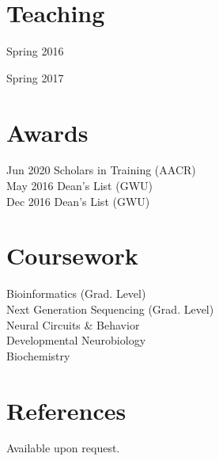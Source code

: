 
\newpage %

\begin{minipage}[t]{0.32\textwidth} %
\sectionspace
\section{Teaching}
\vspace{\topsep} %
\begin{tightitemize}
\item Spring 2016
\item Spring 2017
\end{tightitemize}

\section{Awards} 
Jun 2020 Scholars in Training (AACR)\\
May 2016 Dean's List (GWU) \\
Dec 2016 Dean's List (GWU) \\


\section{Coursework}
Bioinformatics (Grad. Level) \\
Next Generation Sequencing (Grad. Level) \\
Neural Circuits \& Behavior \\
Developmental Neurobiology \\
Biochemistry

\section{References}
Available upon request.

\end{minipage} %
\hfill
